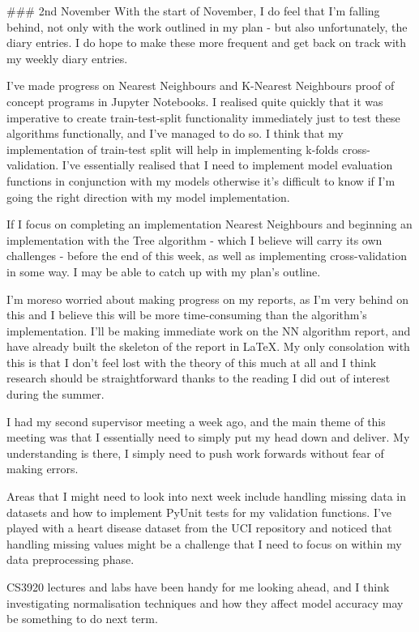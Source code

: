 \documentclass[letterpaper,10pt]{article}
\begin{document}
\begin{markdown}
### 2nd November
With the start of November, I do feel that I'm falling behind, not only with the work outlined in my plan - but also unfortunately, the diary entries. I do hope to make these more frequent and get back on track with my weekly diary entries.  
  
I've made progress on Nearest Neighbours and K-Nearest Neighbours proof of concept programs in Jupyter Notebooks. I realised quite quickly that it was imperative to create train-test-split functionality immediately just to test these algorithms functionally, and I've managed to do so.  
I think that my implementation of train-test split will help in implementing k-folds cross-validation.  
I've essentially realised that I need to implement model evaluation functions in conjunction with my models otherwise it's difficult to know if I'm going the right direction with my model implementation.  
  
If I focus on completing an implementation Nearest Neighbours and beginning an implementation with the Tree algorithm - which I believe will carry its own challenges - before the end of this week, as well as implementing cross-validation in some way. I may be able to catch up with my plan's outline.  
  
I'm moreso worried about making progress on my reports, as I'm very behind on this and I believe this will be more time-consuming than the algorithm's implementation. I'll be making immediate work on the NN algorithm report, and have already built the skeleton of the report in LaTeX.  
My only consolation with this is that I don't feel lost with the theory of this much at all and I think research should be straightforward thanks to the reading I did out of interest during the summer.  
  
I had my second supervisor meeting a week ago, and the main theme of this meeting was that I essentially need to simply put my head down and deliver. My understanding is there, I simply need to push work forwards without fear of making errors.  
  
Areas that I might need to look into next week include handling missing data in datasets and how to implement PyUnit tests for my validation functions. I've played with a heart disease dataset from the UCI repository and noticed that handling missing values might be a challenge that I need to focus on within my data preprocessing phase.  
  
CS3920 lectures and labs have been handy for me looking ahead, and I think investigating normalisation techniques and how they affect model accuracy may be something to do next term.  
  

\end{markdown}
\end{document}
